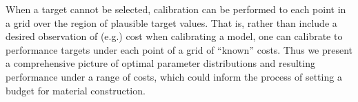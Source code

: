 \documentclass[12pt]{article}
\begin{document}

When a target cannot be selected, calibration can be performed to each point in a grid over the region of plausible target values.
%
That is, rather than include a desired observation of (e.g.) cost when calibrating a model, one can calibrate to performance targets under each point of a grid of ``known'' costs. 
%
Thus we present a comprehensive picture of optimal parameter distributions and resulting performance under a range of costs, which could inform the process of setting a budget for material construction.

\end{document}
